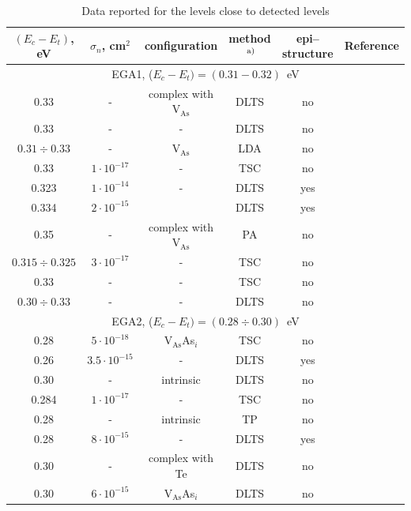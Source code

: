 \documentclass[final,3p,times,twocolumn,authoryear]{elsarticle}
\begin{document}
\begin{table}
\caption{\label{tabEGA1}Data reported for the levels close to detected levels
}
\center
\renewcommand{\arraystretch}{0.65}
\begin{tabular}{cccccc}
\hline
$(E_c-E_t)$, eV &$\sigma_n$, cm$^2$&configuration&method$\textsuperscript{ a)}$&epi--structure&Reference\\
\hline
\multicolumn{6}{c}{EGA1, ($E_c-E_t)=(0.31-0.32)$~eV}\\
0.33&-&complex with V$_\mathrm{As}$&DLTS&no&\cite{EL6:Richter}\\%
0.33&-&-&DLTS&no&\cite{Neild1991}\\ %
$0.31\div0.33$&-&V$_\mathrm{As}$&LDA&no&\cite{EL6:Schultz}\\ %
0.33&$1\cdot10^{-17}$&-&TSC&no&\cite{Pavlovic2000}\\ %
0.323&$1\cdot10^{-14}$&-&DLTS&yes&\cite{Yousefi1995}\\ %
0.334&$2\cdot10^{-15}$&&DLTS&yes&\cite{Yousefi1995}\\ %
0.35&-&complex with V$_\mathrm{As}$&PA&no&\cite{EL6:Kuisma}\\ %
$0.315\div0.325$&$3\cdot10^{-17}$&-&TSC&no&\cite{Pavlovic:GaAs}\\ %
0.33&-&-&TSC&no&\cite{Tomozane:GaAs}\\ %
$0.30\div0.33$&-&-&DLTS&no&\cite{Lang:GaAs}\\ %
\multicolumn{6}{c}{EGA2, ($E_c-E_t)=(0.28\div0.30)$~eV}\\
0.28&$5\cdot10^{-18}$&V$_\mathrm{As}$As$_i$&TSC&no&\cite{Pavlovic2000}\\ %
0.26&$3.5\cdot10^{-15}$&-&DLTS&yes&\cite{Yousefi1995}\\ %
0.30&-&intrinsic&DLTS&no&\cite{PhysRevB1986}\\ %
0.284&$1\cdot10^{-17}$&-&TSC&no&\cite{Pavlovic:GaAs}\\ %
0.28&-&intrinsic&TP&no&\cite{Abele:GaAs}\\ %
0.28&$8\cdot10^{-15}$&-&DLTS&yes&\cite{Mircea1975}\\ %
0.30&-&complex with Te&DLTS&no&\cite{KolFTP1994En}\\ %
0.30&$6\cdot10^{-15}$&V$_\mathrm{As}$As$_i$&DLTS&no&\cite{Pons}\\ %

\end{tabular}
\end{table}
\end{document}
